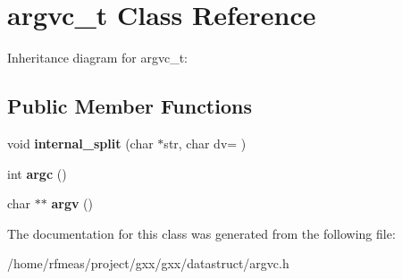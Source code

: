 \hypertarget{classargvc__t}{}\section{argvc\+\_\+t Class Reference}
\label{classargvc__t}


Inheritance diagram for argvc\+\_\+t\+:
\subsection*{Public Member Functions}
\begin{DoxyCompactItemize}
\item 
void {\bfseries internal\+\_\+split} (char $\ast$str, char dv= \textquotesingle{} \textquotesingle{})\hypertarget{classargvc__t_abd61d46968ac80d6d58610340cdaa508}{}\label{classargvc__t_abd61d46968ac80d6d58610340cdaa508}

\item 
int {\bfseries argc} ()\hypertarget{classargvc__t_a769c05c3d5ef114497fec61afffeaa90}{}\label{classargvc__t_a769c05c3d5ef114497fec61afffeaa90}

\item 
char $\ast$$\ast$ {\bfseries argv} ()\hypertarget{classargvc__t_a5f9c39052a39f09702cb96f6932176fd}{}\label{classargvc__t_a5f9c39052a39f09702cb96f6932176fd}

\end{DoxyCompactItemize}


The documentation for this class was generated from the following file\+:\begin{DoxyCompactItemize}
\item 
/home/rfmeas/project/gxx/gxx/datastruct/argvc.\+h\end{DoxyCompactItemize}
